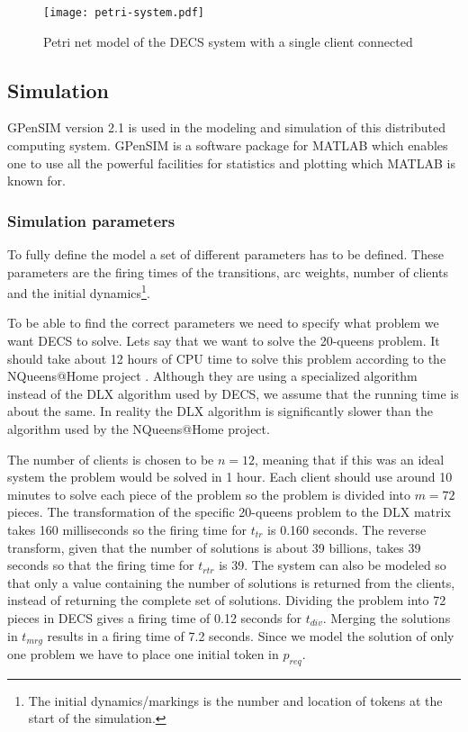 \begin{figure}[htbp]
	\centering 
	\texttt{[image: petri-system.pdf]}
	\caption{Petri net model of the DECS system with a single client connected}
	\label{fig:petri-system}
\end{figure}


\subsection{Simulation}

GPenSIM \cite{gpensim} version 2.1 is used in the modeling and simulation of this distributed computing system.
GPenSIM is a software package for MATLAB which enables one to use all the powerful facilities for statistics and plotting which MATLAB is known for.


\subsubsection{Simulation parameters}

To fully define the model a set of different parameters has to be defined.
These parameters are the firing times of the transitions, arc weights, number of clients and the initial dynamics\footnote{The initial dynamics/markings is the number and location of tokens at the start of the simulation.}.

To be able to find the correct parameters we need to specify what problem we want DECS to solve.
Lets say that we want to solve the 20-queens problem.
It should take about 12 hours of CPU time to solve this problem according to the NQueens@Home project \cite{nqueensathome}.
Although they are using a specialized algorithm instead of the DLX algorithm used by DECS, we assume that the running time is about the same.
In reality the DLX algorithm is significantly slower than the algorithm used by the NQueens@Home project.

The number of clients is chosen to be $n = 12$, meaning that if this was an ideal system the problem would be solved in 1 hour.
Each client should use around 10 minutes to solve each piece of the problem so the problem is divided into $m = 72$ pieces.
The transformation of the specific 20-queens problem to the DLX matrix takes 160 milliseconds so the firing time for $t_{tr}$ is 0.160 seconds.
The reverse transform, given that the number of solutions is about 39 billions, takes 39 seconds so that the firing time for $t_{rtr}$ is 39.
The system can also be modeled so that only a value containing the number of solutions is returned from the clients, instead of returning the complete set of solutions.
Dividing the problem into 72 pieces in DECS gives a firing time of 0.12 seconds for $t_{div}$.
Merging the solutions in $t_{mrg}$ results in a firing time of 7.2 seconds.
Since we model the solution of only one problem we have to place one initial token in $p_{req}$.

